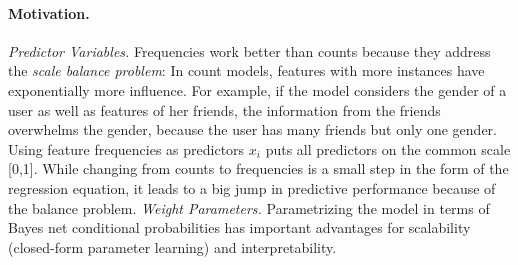 \documentclass{article}
\begin{document}
\paragraph{Motivation.} {\em Predictor Variables.} Frequencies work better than counts because they address the {\em scale balance problem}: In count models, features with more instances have exponentially more influence. For example, if the model considers the gender of a user as well as features of her friends, the information from the friends overwhelms the gender, because the user has many friends but only one gender.
Using feature frequencies as predictors $x_{i}$ puts all predictors on the common scale [0,1]. While changing from counts to frequencies is a small step in the form of the regression equation, it leads to a big jump in predictive performance because of the balance problem. {\em Weight Parameters.} Parametrizing the model in terms of Bayes net conditional probabilities has important advantages for scalability (closed-form parameter learning) and interpretability. %

\end{document}
